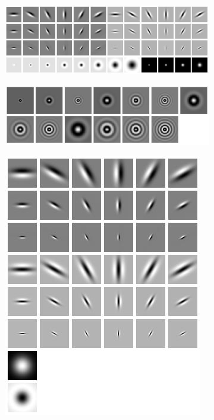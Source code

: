 \begin{figure}[h!]
	\begin{subfigure}[t]{0.38\textwidth}
		\centering
		\includegraphics[width=\textwidth,keepaspectratio]{images/vis_01.jpg}
		\captionsetup{format=plain}
	\end{subfigure}
	\hfill
	\begin{subfigure}[t]{0.38\textwidth}
		\centering
		\includegraphics[width=\textwidth,keepaspectratio]{images/vis_02.jpg}
	\end{subfigure}
	\hfill
	\begin{subfigure}[t]{0.21\textwidth}
		\centering
		\includegraphics[width=\textwidth,keepaspectratio]{images/vis_03.jpg}

\end{subfigure}
\end{figure}
